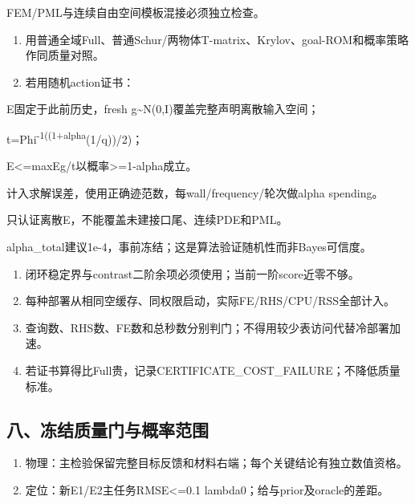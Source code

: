 \documentclass[
  10pt,
  a4paper,
]{article}
\begin{document}
FEM/PML与连续自由空间模板混接必须独立检查。

\begin{enumerate}
\def\labelenumi{\arabic{enumi}.}
\setcounter{enumi}{3}
\item
  用普通全域Full、普通Schur/两物体T-matrix、Krylov、goal-ROM和概率策略作同质量对照。
\item
  若用随机action证书：
\end{enumerate}

E固定于此前历史，fresh g\textasciitilde N(0,I)覆盖完整声明离散输入空间；

t=Phi\textsuperscript{-1((1+alpha}(1/q))/2)；

\textbar\textbar E\textbar\textbar\textless=max\textbar\textbar Eg\textbar\textbar/t以概率\textgreater=1-alpha成立。

计入求解误差，使用正确迹范数，每wall/frequency/轮次做alpha spending。

只认证离散E，不能覆盖未建接口尾、连续PDE和PML。

alpha\_total建议1e-4，事前冻结；这是算法验证随机性而非Bayes可信度。

\begin{enumerate}
\def\labelenumi{\arabic{enumi}.}
\setcounter{enumi}{5}
\item
  闭环稳定界与contrast二阶余项必须使用；当前一阶score近零不够。
\item
  每种部署从相同空缓存、同权限启动，实际FE/RHS/CPU/RSS全部计入。
\item
  查询数、RHS数、FE数和总秒数分别判门；不得用较少表访问代替冷部署加速。
\item
  若证书算得比Full贵，记录CERTIFICATE\_COST\_FAILURE；不降低质量标准。
\end{enumerate}

\hypertarget{ux516bux51bbux7ed3ux8d28ux91cfux95e8ux4e0eux6982ux7387ux8303ux56f4}{%
\subsection{八、冻结质量门与概率范围}\label{ux516bux51bbux7ed3ux8d28ux91cfux95e8ux4e0eux6982ux7387ux8303ux56f4}}

\begin{enumerate}
\def\labelenumi{\arabic{enumi}.}
\item
  物理：主检验保留完整目标反馈和材料右端；每个关键结论有独立数值资格。
\item
  定位：新E1/E2主任务RMSE\textless=0.1
  lambda0；给与prior及oracle的差距。
\end{enumerate}
\end{document}
